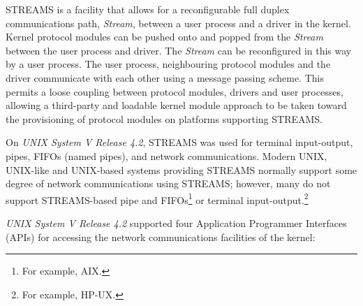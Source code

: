 \documentclass[letterpaper,final,notitlepage,twocolumn,10pt,twoside]{article}
\begin{document}
STREAMS is a facility that allows for a reconfigurable full duplex communications path,
\textit{Stream}, between a user process and a driver in the kernel.   Kernel protocol modules can be
pushed onto and popped from the \textit{Stream} between the user process and driver.  The
\textit{Stream} can be reconfigured in this way by a user process.  The user process, neighbouring
protocol modules and the driver communicate with each other using a message passing scheme.  This
permits a loose coupling between protocol modules, drivers and user processes, allowing a
third-party and loadable kernel module approach to be taken toward the provisioning of protocol
modules on platforms supporting STREAMS.

On \textsl{UNIX System V Release 4.2}, STREAMS was used for terminal input-output, pipes, FIFOs
(named pipes), and network communications.  Modern UNIX, UNIX-like and UNIX-based systems providing
STREAMS normally support some degree of network communications using STREAMS; however, many do not
support STREAMS-based pipe and FIFOs\footnote{For example, AIX.} or terminal
input-output.\footnote{For example, HP-UX.}

\textsl{UNIX System V Release 4.2} supported four Application Programmer Interfaces (APIs) for
accessing the network communications facilities of the kernel:
\end{document}
